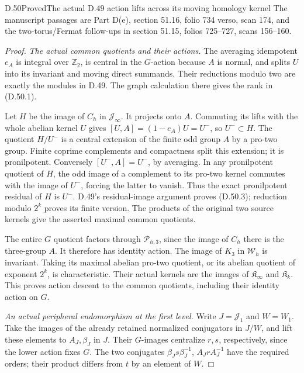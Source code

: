 \begin{statement}{D.50}{Proved}{The actual D.49 action lifts across its moving homology kernel}
The manuscript passages are Part D(e), section 51.16,
folio 734 verso, scan 174, and the two-torus/Fermat
follow-ups in section 51.15, folios 725--727,
scans 156--160.
\end{statement}
\begin{proof}
\emph{The actual common quotients and their actions.}
The averaging idempotent \(e_A\) is integral over
\(\mathbb Z_2\), is central in the \(G\)-action because
\(A\) is normal, and splits \(U\) into its invariant
and moving direct summands. Their reductions modulo
two are exactly the modules in D.49. The graph
calculation there gives the rank in (D.50.1).

Let \(H\) be the image of \(C_h\) in
\(\mathcal J_\infty\). It projects onto \(A\).
Commuting its lifts with the whole abelian kernel
\(U\) gives \([U,A]=(1-e_A)U=U^-\), so \(U^-\subset H\).
The quotient \(H/U^-\) is a central extension of
the finite odd group \(A\) by a pro-two group.
Finite coprime complements and compactness split
this extension; it is pronilpotent. Conversely
\([U^-,A]=U^-\), by averaging. In any pronilpotent
quotient of \(H\), the odd image of a complement
to its pro-two kernel commutes with the image of
\(U^-\), forcing the latter to vanish. Thus the
exact pronilpotent residual of \(H\) is \(U^-\).
D.49's residual-image argument proves (D.50.3);
reduction modulo \(2^k\) proves its finite version.
The products of the original two source kernels
give the asserted maximal common quotients.

The entire \(G\) quotient factors through
\(\mathcal P_{h,3}\), since the image of \(C_h\)
there is the three-group \(A\). It therefore has
identity action. The image of \(K_3\) in
\(\mathcal W_h\) is invariant. Taking its maximal
abelian pro-two quotient, or its abelian quotient
of exponent \(2^k\), is characteristic. Their
actual kernels are the images of
\(\mathfrak K_\infty\) and \(\mathfrak K_k\).
This proves action descent to the common quotients,
including their identity action on \(G\).

\emph{An actual peripheral endomorphism at the first level.}
Write \(J=\mathcal J_1\) and \(W=W_1\). Take the
images of the already retained normalized
conjugators in \(J/W\), and lift these elements
to \(A_J,\beta_J\) in \(J\). Their \(G\)-images
centralize \(r,s\), respectively, since the lower
action fixes \(G\). The two conjugates
\(\beta_Js\beta_J^{-1}\), \(A_JrA_J^{-1}\)
have the required orders; their product differs
from \(t\) by an element of \(W\).


\end{proof}
